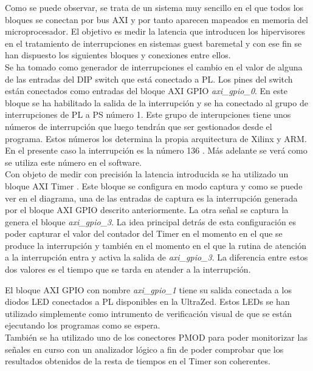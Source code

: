 Como se puede observar, se trata de un sistema muy sencillo en el que todos los bloques se conectan por bus AXI y por tanto aparecen mapeados en memoria del microprocesador. El objetivo es medir la latencia que introducen los hipervisores en el tratamiento de interrupciones en sistemas guest baremetal y con ese fin se han dispuesto los siguientes bloques y conexiones entre ellos.\\

Se ha tomado como generador de interrupciones el cambio en el valor de alguna de las entradas del \acrshort{DIP} switch que está conectado a \acrshort{PL}.
Los pines del switch están conectados como entradas del bloque \acrshort{AXI} \acrshort{GPIO} \cite{axi_gpio} \textit{axi\_gpio\_0}. En este bloque se ha habilitado la salida de la interrupción y se ha conectado al grupo de interrupciones de \acrshort{PL} a \acrshort{PS} número 1. Este grupo de interupciones tiene unos números de interrupción que luego tendrán que ser gestionados desde el programa. Estos números los determina la propia arquitectura de Xilinx y ARM. En el presente caso la interrupción es la número 136 \cite{axi_trm}. Más adelante se verá como se utiliza este número en el software.\\

Con objeto de medir con precisión la latencia introducida se ha utilizado un bloque \acrshort{AXI} Timer \cite{axi_timer}. Este bloque se configura en modo captura y como se puede ver en el diagrama, una de las entradas de captura es la interrupción generada por el bloque \acrshort{AXI} \acrshort{GPIO} descrito anteriormente. La otra señal se captura la genera el bloque \textit{axi\_gpio\_3}. La idea principal detrás de esta configuración es poder capturar el valor del contador del Timer en el momento en el que se produce la interrupción y también en el momento en el que la rutina de atención a la interrupción entra y activa la salida de \textit{axi\_gpio\_3}. La diferencia entre estos dos valores es el tiempo que se tarda en atender a la interrupción.

El bloque \acrshort{AXI} \acrshort{GPIO} con nombre \textit{axi\_gpio\_1} tiene su salida conectada a los diodos LED conectados a PL disponibles en la UltraZed. Estos LEDs se han utilizado simplemente como intrumento de verificación visual de que se están ejecutando los programas como se espera.\\

También se ha utilizado uno de los conectores \acrshort{PMOD} para poder monitorizar las señales en curso con un analizador lógico a fin de poder comprobar que los resultados obtenidos de la resta de tiempos en el Timer son coherentes.\\

